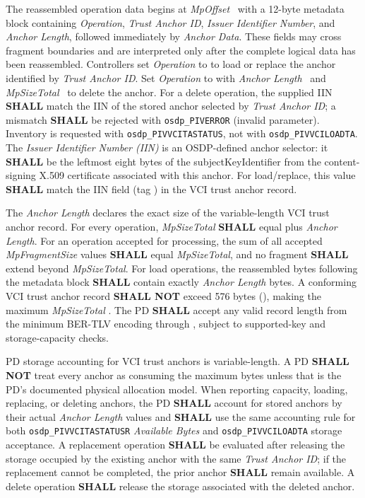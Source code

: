 The reassembled operation data begins at \emph{MpOffset}~ with a 12-byte
metadata block containing \emph{Operation}, \emph{Trust Anchor ID}, \emph{Issuer Identifier
Number}, and \emph{Anchor Length}, followed immediately by \emph{Anchor Data}. These fields
may cross fragment boundaries and are interpreted only after the complete logical data has been
reassembled. Controllers set \emph{Operation} to  to load or replace the anchor
identified by \emph{Trust Anchor ID}. Set \emph{Operation} to  with \emph{Anchor
Length}~ and \emph{MpSizeTotal}~ to delete the anchor. For a
delete operation, the supplied IIN \textbf{SHALL} match the IIN of the stored anchor selected
by \emph{Trust Anchor ID}; a mismatch \textbf{SHALL} be rejected with
\texttt{osdp\_PIVERROR}  (invalid parameter). Inventory is
requested with \texttt{osdp\_PIVVCITASTATUS}, not with \texttt{osdp\_PIVVCILOADTA}. The
\emph{Issuer Identifier Number (IIN)} is an OSDP-defined anchor selector: it \textbf{SHALL} be
the leftmost eight bytes of the subjectKeyIdentifier from the content-signing X.509 certificate
associated with this anchor. For load/replace, this value \textbf{SHALL} match the IIN field
(tag ) in the VCI trust anchor record.

The \emph{Anchor Length} declares the exact size of the variable-length VCI trust anchor record.
For every operation, \emph{MpSizeTotal} \textbf{SHALL} equal  plus \emph{Anchor
Length}. For an operation accepted for processing, the sum of all accepted
\emph{MpFragmentSize} values \textbf{SHALL} equal \emph{MpSizeTotal}, and no fragment
\textbf{SHALL} extend beyond \emph{MpSizeTotal}. For load
operations, the reassembled bytes following the metadata block \textbf{SHALL} contain exactly
\emph{Anchor Length} bytes. A conforming VCI trust anchor record \textbf{SHALL NOT} exceed 576
bytes (), making the maximum \emph{MpSizeTotal} . The PD
\textbf{SHALL} accept any valid record length from the minimum BER-TLV encoding through
, subject to supported-key and storage-capacity checks.

PD storage accounting for VCI trust anchors is variable-length. A PD \textbf{SHALL NOT} treat every anchor as consuming the maximum  bytes unless that is the PD's documented physical allocation model. When reporting capacity, loading, replacing, or deleting anchors, the PD \textbf{SHALL} account for stored anchors by their actual \emph{Anchor Length} values and \textbf{SHALL} use the same accounting rule for both \texttt{osdp\_PIVVCITASTATUSR} \emph{Available Bytes} and \texttt{osdp\_PIVVCILOADTA} storage acceptance. A replacement operation \textbf{SHALL} be evaluated after releasing the storage occupied by the existing anchor with the same \emph{Trust Anchor ID}; if the replacement cannot be completed, the prior anchor \textbf{SHALL} remain available. A delete operation \textbf{SHALL} release the storage associated with the deleted anchor.

